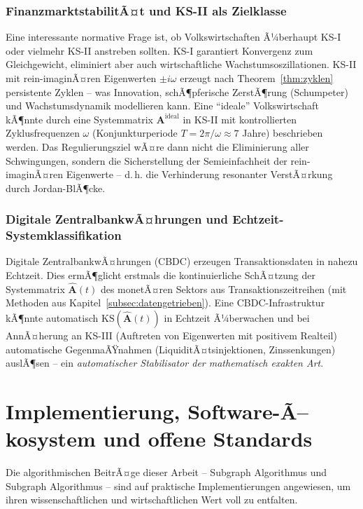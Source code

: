 ﻿\documentclass[12pt, a4paper, titlepage]{report}
\theoremstyle{definition}
\theoremstyle{remark}
\newcommand{\vA}{\bm{A}}
\newcommand{\KS}{\mathrm{KS}}
\begin{document}
\subsubsection*{FinanzmarktstabilitÃ¤t und KS-II als Zielklasse}

Eine interessante normative Frage ist, ob Volkswirtschaften Ã¼berhaupt KS-I oder
vielmehr KS-II anstreben sollten. KS-I garantiert Konvergenz zum Gleichgewicht,
eliminiert aber auch wirtschaftliche Wachstumsoszillationen. KS-II mit
rein-imaginÃ¤ren Eigenwerten $\pm i\omega$ erzeugt nach Theorem~\ref{thm:zyklen}
persistente Zyklen -- was Innovation, schÃ¶pferische ZerstÃ¶rung (Schumpeter)
und Wachstumsdynamik modellieren kann. Eine ``ideale'' Volkswirtschaft kÃ¶nnte
durch eine Systemmatrix $\vA^{\mathrm{ideal}}$ in KS-II mit kontrollierten
Zyklusfrequenzen $\omega$ (Konjunkturperiode $T = 2\pi/\omega \approx 7$ Jahre)
beschrieben werden. Das Regulierungsziel wÃ¤re dann nicht die Eliminierung aller
Schwingungen, sondern die Sicherstellung der Semieinfachheit der rein-imaginÃ¤ren
Eigenwerte -- d.\,h. die Verhinderung resonanter VerstÃ¤rkung durch Jordan-BlÃ¶cke.

\subsubsection*{Digitale ZentralbankwÃ¤hrungen und Echtzeit-Systemklassifikation}

Digitale ZentralbankwÃ¤hrungen (CBDC) erzeugen Transaktionsdaten in nahezu
Echtzeit. Dies ermÃ¶glicht erstmals die kontinuierliche SchÃ¤tzung der
Systemmatrix $\hat{\vA}(t)$ des monetÃ¤ren Sektors aus Transaktionszeitreihen
(mit Methoden aus Kapitel~\ref{subsec:datengetrieben}). Eine CBDC-Infrastruktur
kÃ¶nnte automatisch $\KS(\hat{\vA}(t))$ in Echtzeit Ã¼berwachen und bei
AnnÃ¤herung an KS-III (Auftreten von Eigen\-werten mit positivem Realteil) automatische
GegenmaÃŸnahmen (LiquiditÃ¤ts\-injektionen, Zinssenkungen) auslÃ¶sen -- ein
\emph{automatischer Stabilisator der mathematisch exakten Art}.

\section{Implementierung, Software-Ã–kosystem und offene Standards}
\label{subsec:software}

Die algorithmischen BeitrÃ¤ge dieser Arbeit -- Subgraph Algorithmus und
Subgraph Algorithmus -- sind auf praktische Implementierungen angewiesen,
um ihren wissenschaftlichen und wirtschaftlichen Wert voll zu entfalten.
\end{document}
